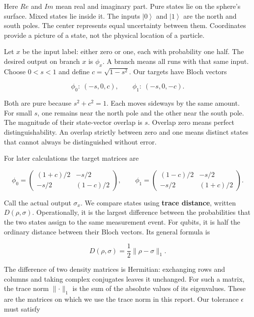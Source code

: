 \documentclass[11pt,letterpaper]{article}
\begin{document}
Here \(Re\) and \(Im\) mean real and imaginary part. Pure states lie on the sphere's surface. Mixed states lie inside it. The inputs \(\left| 0 \right\rangle\) and \(\left| 1 \right\rangle\) are the north and south poles. The center represents equal uncertainty between them. Coordinates provide a picture of a state, not the physical location of a particle.

Let \(x\) be the input label: either zero or one, each with probability one half. The desired output on branch \(x\) is \(\phi_{x}\). A branch means all runs with that same input. Choose \(0 < s < 1\) and define \(c = \sqrt{1 - s^{2}}\). Our targets have Bloch vectors

\[\phi_{0}:\ ( - s,0,c),\quad\quad\phi_{1}:\ ( - s,0, - c).\]

Both are pure because \(s^{2} + c^{2} = 1\). Each moves sideways by the same amount. For small \(s\), one remains near the north pole and the other near the south pole. The magnitude of their state-vector overlap is \(s\). Overlap zero means perfect distinguishability. An overlap strictly between zero and one means distinct states that cannot always be distinguished without error.

For later calculations the target matrices are

\[\phi_{0} = \begin{pmatrix}
(1 + c)/2 & - s/2 \\
 - s/2 & (1 - c)/2
\end{pmatrix},\quad\quad\phi_{1} = \begin{pmatrix}
(1 - c)/2 & - s/2 \\
 - s/2 & (1 + c)/2
\end{pmatrix}.\]

Call the actual output \(\sigma_{x}\). We compare states using \textbf{trace distance}, written \(D(\rho,\sigma)\). Operationally, it is the largest difference between the probabilities that the two states assign to the same measurement event. For qubits, it is half the ordinary distance between their Bloch vectors. Its general formula is

\[D(\rho,\sigma) = \frac{1}{2} \lVert \rho - \sigma\rVert_{1}.\]

The difference of two density matrices is Hermitian: exchanging rows and columns and taking complex conjugates leaves it unchanged. For such a matrix, the trace norm \(\lVert \cdot\rVert_{1}\) is the sum of the absolute values of its eigenvalues. These are the matrices on which we use the trace norm in this report. Our tolerance \(\epsilon\) must satisfy
\end{document}
